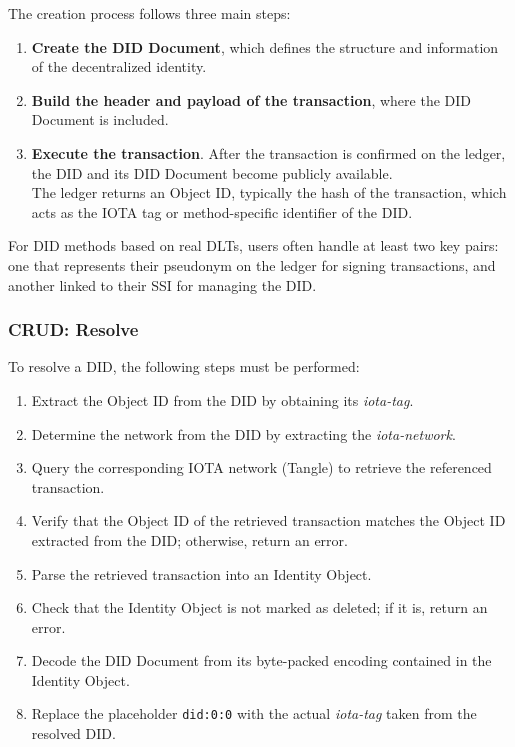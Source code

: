 \noindent
The creation process follows three main steps:
\begin{enumerate}
    \item \textbf{Create the DID Document}, which defines the structure and information of the decentralized identity.
    \item \textbf{Build the header and payload of the transaction}, where the DID Document is included.
    \item \textbf{Execute the transaction}. After the transaction is confirmed on the ledger, the DID and its DID Document become publicly available. \\
    The ledger returns an Object ID, typically the hash of the transaction, which acts as the IOTA tag or method-specific identifier of the DID.
\end{enumerate}

\noindent
For DID methods based on real DLTs, users often handle at least two key pairs: one that represents their pseudonym on the ledger for signing transactions, and another linked to their SSI for managing the DID.

\subsubsection* {CRUD: Resolve}

To resolve a DID, the following steps must be performed:
\begin{enumerate}
    \item Extract the Object ID from the DID by obtaining its \textit{iota-tag}.
    \item Determine the network from the DID by extracting the \textit{iota-network}.
    \item Query the corresponding IOTA network (Tangle) to retrieve the referenced transaction.
    \item Verify that the Object ID of the retrieved transaction matches the Object ID extracted from the DID; otherwise, return an error.
    \item Parse the retrieved transaction into an Identity Object.
    \item Check that the Identity Object is not marked as deleted; if it is, return an error.
    \item Decode the DID Document from its byte-packed encoding contained in the Identity Object.
    \item Replace the placeholder \texttt{did:0:0} with the actual \textit{iota-tag} taken from the resolved DID.
\end{enumerate}

